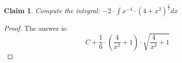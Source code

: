 \documentclass{article}
\newtheorem{theorem}{Claim}
\begin{document}
\begin{theorem}
Compute the integral:
$
-2 \cdot \int x^{-4} \cdot \left(4+x^2\right)^{\frac{ 1 }{ 2 }}   dx
$
\end{theorem}

\begin{proof}
The answer is:
\[
C+\frac{1}{6}\cdot\left(\frac{4}{x^2}+1\right)\cdot\sqrt{\frac{4}{x^2}+1}
\]
\end{proof}
\end{document}
